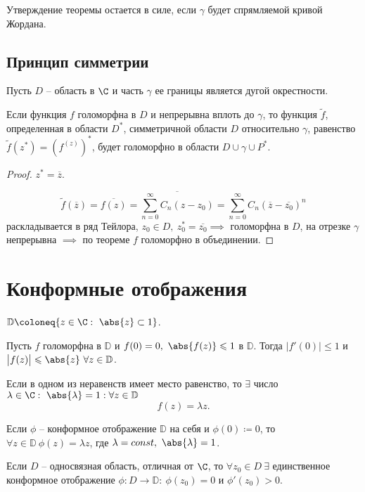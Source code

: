 \begin{remark}
	Утверждение теоремы остается в силе, если $\gamma $ будет спрямляемой кривой Жордана.
\end{remark}

\subsection{Принцип симметрии}

\begin{theorem}
	Пусть $D$ -- область в $\C$ и часть $\gamma $ ее границы является дугой окрестности.

	Если функция $f$ голоморфна в $D$ и непрерывна вплоть до $\gamma $, то функция $\widetilde{f}$, определенная в области $D^{*} $, симметричной области $D$ относительно $\gamma $, равенство $\widetilde{f}(z^{*} ) = (f^{(z)} )^{*} $, будет голоморфно в области $D \cup \gamma \cup P^{*} $.
\end{theorem}

\begin{proof}
	$z^{*} = \overline{z}  $.

	\[
		\widetilde{f}(\overline{z} ) = \overline{f(z)} = \overline{\sum_{n=0}^{\infty } C_n(z-z_0)} = \sum_{n=0}^{\infty } C_n (\overline{z}  - \overline{z_0} )^n
	\]
	раскладывается в ряд Тейлора, $z_0 \in D, \ z_0^{*} = \overline{z_0} \implies $ голоморфна в $D$, на отрезке $\gamma $ непрерывна $\implies $ по теореме $f$ голоморфно в объединении.
\end{proof}

\section{Конформные отображения}

\begin{theorem}
	$\mathbb{D} \coloneq \{z \in \C: \ \abs{z} \subset 1\}$.

	Пусть $f$ голоморфна в $\mathbb{D}$ и $f(0) = 0, \ \abs{f(z)} \leqslant 1$ в $\mathbb{D}$. Тогда $\big|f '(0)\big| \leqslant 1$ и $\big|f(z)\big| \leqslant \abs{z} \ \forall z \in \mathbb{D}$.
\end{theorem}

\begin{remark}
	Если в одном из неравенств имеет место равенство, то $\exists $ число $\lambda \in \C: \ \abs{\lambda } =1 : \forall z \in \mathbb{D}$
	\[
		f(z) = \lambda z.
	\]
\end{remark}

\begin{remark}
	Если $\phi $ -- конформное отображение $\mathbb{D}$ на себя и $\phi (0) \coloneq 0$, то $\forall  z \in \mathbb{D} \ \phi (z) = \lambda z$, где $\lambda = const, \ \abs{\lambda }  = 1$.
\end{remark}

\begin{theorem}[Римана]
	Если $D$ -- односвязная область, отличная от $\C$, то $\forall z_0 \in D \ \exists $ единственное конформное отображение $\phi : D \rightarrow \mathbb{D}: \ \phi (z_0)= 0$ и $\phi ' (z_0) > 0$.
\end{theorem}
